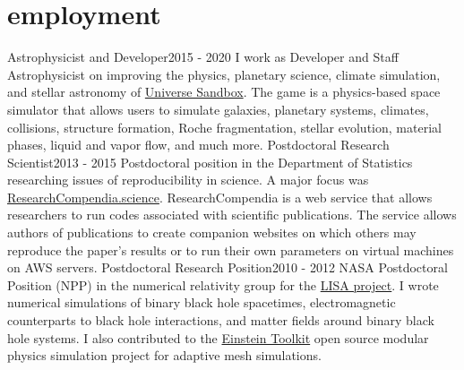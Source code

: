 \documentclass[]{seiler-resume}
\begin{document}
\section{employment}
\begin{entrylist}
{Astrophysicist and Developer}{2015 - 2020}
{I work as Developer and Staff Astrophysicist on improving the physics, planetary science, climate simulation, and stellar astronomy of  \href{http://universesandbox.com}{ Universe Sandbox}. The game is a physics-based space simulator that allows users to simulate galaxies, planetary systems, climates, collisions, structure formation, Roche fragmentation, stellar evolution, material phases, liquid and vapor flow, and much more.}
{Postdoctoral Research Scientist}{2013 - 2015}
{Postdoctoral position in the Department of Statistics researching issues of reproducibility in science. A major focus was \href{http://researchcompendia.science/about/\#AboutUs}{ResearchCompendia.science}. ResearchCompendia is a web service that allows researchers to run codes associated with scientific publications. The service allows authors of publications to create companion websites on which others may reproduce the paper's results or to run their own parameters on virtual machines on AWS servers.}
{Postdoctoral Research Position}{2010 - 2012}
{NASA Postdoctoral Position (NPP) in the numerical relativity group for the \href{https://lisa.nasa.gov/}{LISA project}. I wrote numerical simulations of binary black hole spacetimes, electromagnetic counterparts to black hole interactions, and matter fields around binary black hole systems. I also contributed to the \href{https://einsteintoolkit.org/members.html}{Einstein Toolkit} open source modular physics simulation project for adaptive mesh simulations. }

\end{entrylist}
\end{document}

